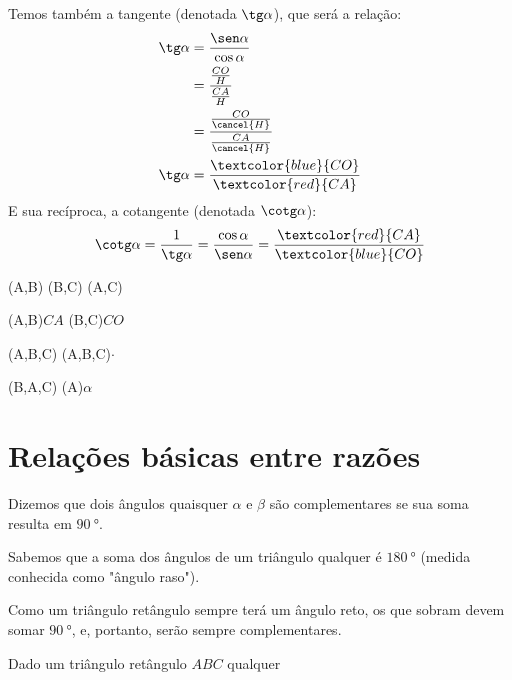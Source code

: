 \begin{minipage}{\textwidth}
	\begin{multicols}{2}
		\noindent Temos também a tangente (denotada $\tg \alpha$), que será a relação:
		\begin{align*}
			\tg\alpha & = \frac{\sen\alpha}{\cos\alpha}                        \\
			          & = \dfrac{\frac{CO}{H}}{\frac{CA}{H}}                   \\
			          & = \dfrac{\frac{CO}{\cancel{H}}}{\frac{CA}{\cancel{H}}} \\
			\tg\alpha & = \frac{\textcolor{blue}{CO}}{\textcolor{red}{CA}}
		\end{align*}
		\noindent E sua recíproca, a cotangente (denotada $\cotg\alpha$):
		$$
			\cotg\alpha=\frac{1}{\tg\alpha}=\frac{\cos\alpha}{\sen\alpha}=\frac{\textcolor{red}{CA}}{\textcolor{blue}{CO}}
		$$
		\begin{tikzscale}[0.8]
			\tkzDrawSegment[red](A,B)
			\tkzDrawSegment[blue](B,C)
			\tkzDrawSegment(A,C)

			\tkzLabelSegment[below=2pt, xshift=5pt, red](A,B){$CA$}
			(B,C){$CO$}

			\tkzMarkRightAngle[line width=0.3pt](A,B,C)
			\tkzLabelAngle[pos=0.15](A,B,C){\small$\cdot$}

			\tkzMarkAngle[size=1](B,A,C)
			\tkzLabelPoint[xshift=0.71cm, yshift=14pt](A){$\alpha$}

		\end{tikzscale}
	\end{multicols}
\end{minipage}

\section{Relações básicas entre razões}

Dizemos que dois ângulos quaisquer $\alpha$ e $\beta$ são complementares se sua soma resulta em $\SI{90}{\degree}$.

Sabemos que a soma dos ângulos de um triângulo qualquer é $\SI{180}{\degree}$ (medida conhecida como "ângulo raso").

Como um triângulo retângulo sempre terá um ângulo reto, os que sobram devem somar $\SI{90}{\degree}$, e, portanto, serão sempre complementares.

Dado um triângulo retângulo $ABC$ qualquer

